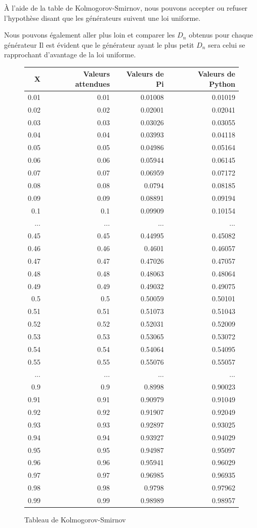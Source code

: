 \documentclass[10pt,a4paper]{article}
\begin{document}
	À l'aide de la table de Kolmogorov-Smirnov, nous pouvons accepter ou refuser l'hypothèse disant que les générateurs suivent une loi uniforme.
	
	Nous pouvons également aller plus loin et comparer les $D_n$ obtenus pour chaque générateur
	 Il est évident que le générateur ayant le plus petit $D_n$ sera celui se rapprochant d'avantage de la loi uniforme.
	\begin{figure}[h]
		\centering
		\begin{tabular}{|r|r|r|r|}
			\hline
			X & Valeurs attendues & Valeurs de Pi & Valeurs de Python\\
			\hline
			0.01 & 0.01 & 0.01008 & 0.01019\\
			0.02 & 0.02 & 0.02001 & 0.02041\\
			0.03 & 0.03 & 0.03026 & 0.03055\\
			0.04 & 0.04 & 0.03993 & 0.04118\\
			0.05 & 0.05 & 0.04986 & 0.05164\\
			0.06 & 0.06 & 0.05944 & 0.06145\\
			0.07 & 0.07 & 0.06959 & 0.07172\\
			0.08 & 0.08 & 0.0794 & 0.08185\\
			0.09 & 0.09 & 0.08891 & 0.09194\\
			0.1 & 0.1 & 0.09909 & 0.10154\\
			... & ... & ... & ...\\
			0.45 & 0.45 & 0.44995 & 0.45082\\
			0.46 & 0.46 & 0.4601 & 0.46057\\
			0.47 & 0.47 & 0.47026 & 0.47057\\
			0.48 & 0.48 & 0.48063 & 0.48064\\
			0.49 & 0.49 & 0.49032 & 0.49075\\
			0.5 & 0.5 & 0.50059 & 0.50101\\
			0.51 & 0.51 & 0.51073 & 0.51043\\
			0.52 & 0.52 & 0.52031 & 0.52009\\
			0.53 & 0.53 & 0.53065 & 0.53072\\
			0.54 & 0.54 & 0.54064 & 0.54095\\
			0.55 & 0.55 & 0.55076 & 0.55057\\
			... & ... & ... & ...\\
			0.9 & 0.9 & 0.8998 & 0.90023\\
			0.91 & 0.91 & 0.90979 & 0.91049\\
			0.92 & 0.92 & 0.91907 & 0.92049\\
			0.93 & 0.93 & 0.92897 & 0.93025\\
			0.94 & 0.94 & 0.93927 & 0.94029\\
			0.95 & 0.95 & 0.94987 & 0.95097\\
			0.96 & 0.96 & 0.95941 & 0.96029\\
			0.97 & 0.97 & 0.96985 & 0.96935\\
			0.98 & 0.98 & 0.9798 & 0.97962\\
			0.99 & 0.99 & 0.98989 & 0.98957\\
			\hline
		\end{tabular}
	\caption{Tableau de Kolmogorov-Smirnov}
	\end{figure}
	
\end{document}
